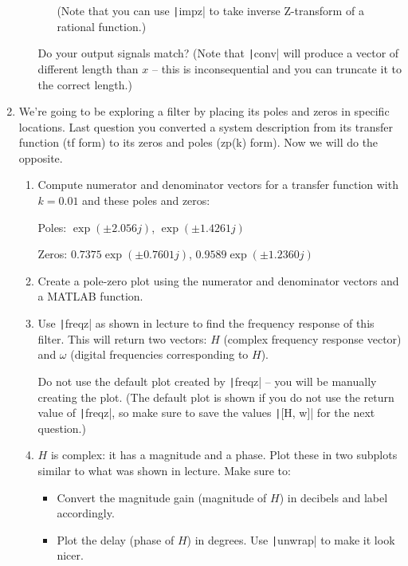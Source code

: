\documentclass{article}
\begin{document}
\begin{enumerate}
\begin{enumerate}
\begin{enumerate}
      (Note that you can use \texttt|impz| to take inverse Z-transform of a rational function.)
    \end{enumerate}
    Do your output signals match? (Note that \texttt|conv| will produce a vector of different length than $x$ -- this is inconsequential and you can truncate it to the correct length.)
  \end{enumerate}

\item We're going to be exploring a filter by placing its poles and zeros in specific locations. Last question you converted a system description from its transfer function (tf form) to its zeros and poles (zp(k) form). Now we will do the opposite.
  \begin{enumerate}
  \item Compute numerator and denominator vectors for a transfer function with $k=0.01$ and these poles and zeros:

    Poles: $\exp(\pm2.056j)$, $\exp(\pm1.4261j)$

    Zeros: $0.7375\exp(\pm0.7601j)$, $0.9589\exp(\pm1.2360j)$

  \item Create a pole-zero plot using the numerator and denominator vectors and a MATLAB function.

  \item Use \texttt|freqz| as shown in lecture to find the frequency response of this filter. This will return two vectors: $H$ (complex frequency response vector) and $\omega$ (digital frequencies corresponding to $H$).

    Do not use the default plot created by \texttt|freqz| -- you will be manually creating the plot. (The default plot is shown if you do not use the return value of \texttt|freqz|, so make sure to save the values \texttt|[H, w]| for the next question.)

  \item $H$ is complex: it has a magnitude and a phase. Plot these in two subplots similar to what was shown in lecture. Make sure to:
    \begin{itemize}
    \item Convert the magnitude gain (magnitude of $H$) in decibels and label accordingly.
    \item Plot the delay (phase of $H$) in degrees. Use \texttt|unwrap| to make it look nicer.


\end{itemize}
\end{enumerate}
\end{enumerate}
\end{document}
